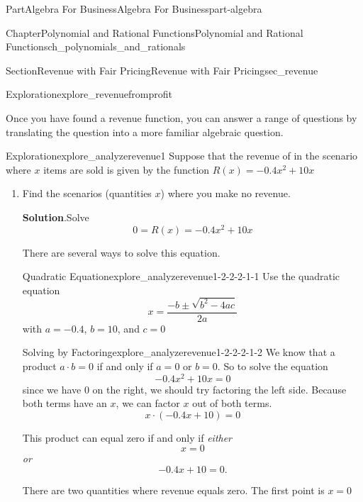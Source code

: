 \documentclass[oneside,10pt,]{tufte-book}
\newcommand{\blocktitlefont}{\relax}
\numberwithin{equation}{chapter}
\begin{document}
\begin{partptx}{Part}{Algebra For Business}{}{Algebra For Business}{}{}{part-algebra}
\begin{chapterptx}{Chapter}{Polynomial and Rational Functions}{}{Polynomial and Rational Functions}{}{}{ch_polynomials_and_rationals}
\begin{sectionptx}{Section}{Revenue with Fair Pricing}{}{Revenue with Fair Pricing}{}{}{sec_revenue}
\begin{exploration}{Exploration}{}{explore_revenuefromprofit}
\begin{enumerate}[font=\bfseries,label=(\alph*),ref=\alph*]
%
\end{enumerate}%
\end{exploration}%
Once you have found a revenue function, you can answer a range of questions by translating the question into a more familiar algebraic question.%
\begin{exploration}{Exploration}{}{explore_analyzerevenue1}%
Suppose that the revenue of in the scenario where \(x\) items are sold is given by the function \(R(x) = -0.4x^2 + 10x\)%
\begin{enumerate}[font=\bfseries,label=(\alph*),ref=\alph*]%
\item{}Find the scenarios (quantities \(x\)) where you make no revenue.%
\par\smallskip%
\noindent\textbf{\blocktitlefont Solution}.\hypertarget{explore_analyzerevenue1-2-2}{}\quad{}Solve%
\begin{equation*}
0 = R(x) = -0.4x^2 +10x 
\end{equation*}
%
\par
There are several ways to solve this equation.%
\begin{descriptionlist}
\begin{dlimedium}{Quadratic Equation}{explore_analyzerevenue1-2-2-2-1-1}%
Use the quadratic equation%
\begin{equation*}
x = \dfrac{-b \pm \sqrt{b^2 - 4 a c}}{2a}
\end{equation*}
with \(a=-0.4\), \(b=10\), and \(c=0\)%
\end{dlimedium}%
\begin{dlimedium}{Solving by Factoring}{explore_analyzerevenue1-2-2-2-1-2}%
We know that a product \(a\cdot b= 0\) if and only if \(a=0\) or \(b=0\). So to solve the equation%
\begin{equation*}
-0.4x^2 + 10x = 0
\end{equation*}
since we have 0 on the right, we should try factoring the left side. Because both terms have an \(x\), we can factor \(x\) out of both terms.%
\begin{equation*}
x\cdot (-0.4x + 10 ) = 0
\end{equation*}
%
\par
This product can equal zero if and only if \emph{either}%
\begin{equation*}
x=0
\end{equation*}
\emph{or}%
\begin{equation*}
-0.4x + 10 = 0\text{.}
\end{equation*}
%
\par
There are two quantities where revenue equals zero.  The first point is \(x=0\)%

\end{dlimedium}
\end{descriptionlist}
\end{enumerate}
\end{exploration}
\end{sectionptx}
\end{chapterptx}
\end{partptx}
\end{document}
